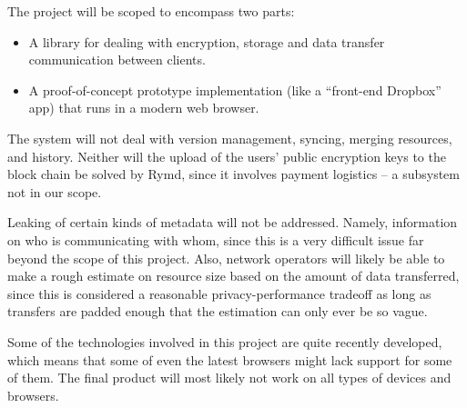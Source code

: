 The project will be scoped to encompass two parts:
\begin{itemize}
\item A library for dealing with encryption, storage and data transfer communication between clients.
\item A proof-of-concept prototype implementation (like a “front-end Dropbox” app) that runs in a modern web browser.
\end{itemize}
The system will not deal with version management, syncing, merging resources, and history. Neither will the upload of the users’ public encryption keys to the block chain be solved by Rymd, since it involves payment logistics – a subsystem not in our scope.

Leaking of certain kinds of metadata will not be addressed. Namely, information on who is communicating with whom, since this is a very difficult issue far beyond the scope of this project. Also, network operators will likely be able to make a rough estimate on resource size based on the amount of data transferred, since this is considered a reasonable privacy-performance tradeoff as long as transfers are padded enough that the estimation can only ever be so vague.

Some of the technologies involved in this project are quite recently developed, which means that some of even the latest browsers might lack support for some of them. The final product will most likely not work on all types of devices and browsers.


